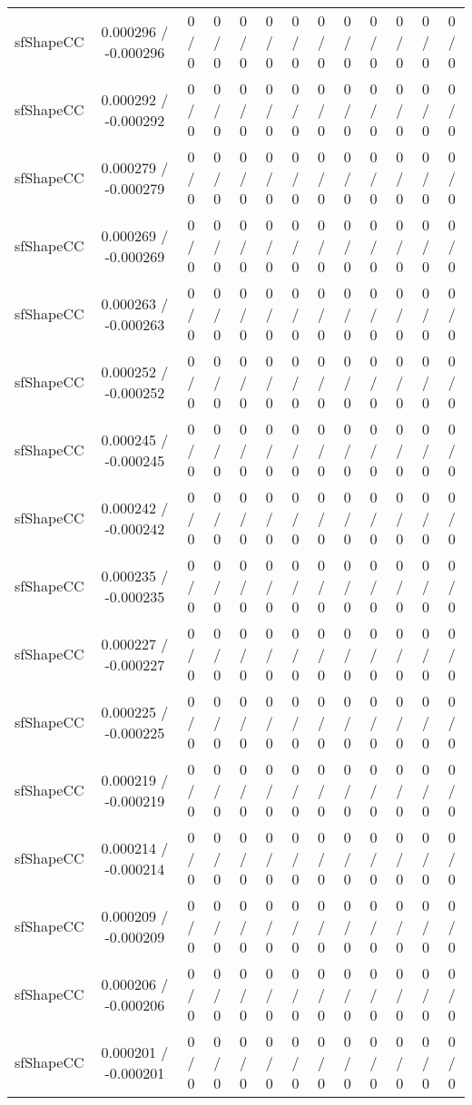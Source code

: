 \documentclass[10pt]{article}
\begin{document}
\begin{table}[htbp]
\begin{center}
\begin{tabular}{|c|c|c|c|c|c|c|c|c|c|c|c|c|}
  sfShapeCC & 0.000296 / -0.000296 & 0 / 0 & 0 / 0 & 0 / 0 & 0 / 0 & 0 / 0 & 0 / 0 & 0 / 0 & 0 / 0 & 0 / 0 & 0 / 0 & 0 / 0 \\ 
  sfShapeCC & 0.000292 / -0.000292 & 0 / 0 & 0 / 0 & 0 / 0 & 0 / 0 & 0 / 0 & 0 / 0 & 0 / 0 & 0 / 0 & 0 / 0 & 0 / 0 & 0 / 0 \\ 
  sfShapeCC & 0.000279 / -0.000279 & 0 / 0 & 0 / 0 & 0 / 0 & 0 / 0 & 0 / 0 & 0 / 0 & 0 / 0 & 0 / 0 & 0 / 0 & 0 / 0 & 0 / 0 \\ 
  sfShapeCC & 0.000269 / -0.000269 & 0 / 0 & 0 / 0 & 0 / 0 & 0 / 0 & 0 / 0 & 0 / 0 & 0 / 0 & 0 / 0 & 0 / 0 & 0 / 0 & 0 / 0 \\ 
  sfShapeCC & 0.000263 / -0.000263 & 0 / 0 & 0 / 0 & 0 / 0 & 0 / 0 & 0 / 0 & 0 / 0 & 0 / 0 & 0 / 0 & 0 / 0 & 0 / 0 & 0 / 0 \\ 
  sfShapeCC & 0.000252 / -0.000252 & 0 / 0 & 0 / 0 & 0 / 0 & 0 / 0 & 0 / 0 & 0 / 0 & 0 / 0 & 0 / 0 & 0 / 0 & 0 / 0 & 0 / 0 \\ 
  sfShapeCC & 0.000245 / -0.000245 & 0 / 0 & 0 / 0 & 0 / 0 & 0 / 0 & 0 / 0 & 0 / 0 & 0 / 0 & 0 / 0 & 0 / 0 & 0 / 0 & 0 / 0 \\ 
  sfShapeCC & 0.000242 / -0.000242 & 0 / 0 & 0 / 0 & 0 / 0 & 0 / 0 & 0 / 0 & 0 / 0 & 0 / 0 & 0 / 0 & 0 / 0 & 0 / 0 & 0 / 0 \\ 
  sfShapeCC & 0.000235 / -0.000235 & 0 / 0 & 0 / 0 & 0 / 0 & 0 / 0 & 0 / 0 & 0 / 0 & 0 / 0 & 0 / 0 & 0 / 0 & 0 / 0 & 0 / 0 \\ 
  sfShapeCC & 0.000227 / -0.000227 & 0 / 0 & 0 / 0 & 0 / 0 & 0 / 0 & 0 / 0 & 0 / 0 & 0 / 0 & 0 / 0 & 0 / 0 & 0 / 0 & 0 / 0 \\ 
  sfShapeCC & 0.000225 / -0.000225 & 0 / 0 & 0 / 0 & 0 / 0 & 0 / 0 & 0 / 0 & 0 / 0 & 0 / 0 & 0 / 0 & 0 / 0 & 0 / 0 & 0 / 0 \\ 
  sfShapeCC & 0.000219 / -0.000219 & 0 / 0 & 0 / 0 & 0 / 0 & 0 / 0 & 0 / 0 & 0 / 0 & 0 / 0 & 0 / 0 & 0 / 0 & 0 / 0 & 0 / 0 \\ 
  sfShapeCC & 0.000214 / -0.000214 & 0 / 0 & 0 / 0 & 0 / 0 & 0 / 0 & 0 / 0 & 0 / 0 & 0 / 0 & 0 / 0 & 0 / 0 & 0 / 0 & 0 / 0 \\ 
  sfShapeCC & 0.000209 / -0.000209 & 0 / 0 & 0 / 0 & 0 / 0 & 0 / 0 & 0 / 0 & 0 / 0 & 0 / 0 & 0 / 0 & 0 / 0 & 0 / 0 & 0 / 0 \\ 
  sfShapeCC & 0.000206 / -0.000206 & 0 / 0 & 0 / 0 & 0 / 0 & 0 / 0 & 0 / 0 & 0 / 0 & 0 / 0 & 0 / 0 & 0 / 0 & 0 / 0 & 0 / 0 \\ 
  sfShapeCC & 0.000201 / -0.000201 & 0 / 0 & 0 / 0 & 0 / 0 & 0 / 0 & 0 / 0 & 0 / 0 & 0 / 0 & 0 / 0 & 0 / 0 & 0 / 0 & 0 / 0 \\ 

\end{tabular}
\end{center}
\end{table}
\end{document}
